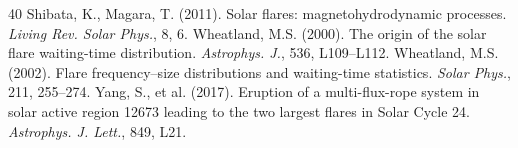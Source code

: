 \documentclass[12pt,a4paper]{article}
\begin{document}
\begin{thebibliography}{40}
 Shibata, K., Magara, T. (2011). Solar flares: magnetohydrodynamic processes. \textit{Living Rev. Solar Phys.}, 8, 6.
 Wheatland, M.S. (2000). The origin of the solar flare waiting-time distribution. \textit{Astrophys. J.}, 536, L109--L112.
 Wheatland, M.S. (2002). Flare frequency--size distributions and waiting-time statistics. \textit{Solar Phys.}, 211, 255--274.
 Yang, S., et al. (2017). Eruption of a multi-flux-rope system in solar active region 12673 leading to the two largest flares in Solar Cycle 24. \textit{Astrophys. J. Lett.}, 849, L21.
\end{thebibliography}
\end{document}
